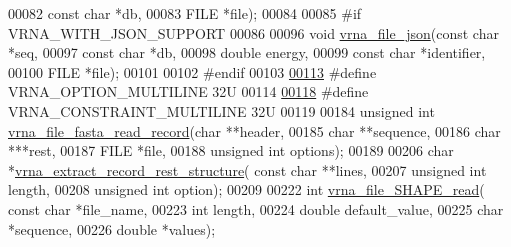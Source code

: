 \begin{DoxyCode}
00082                       \textcolor{keyword}{const} \textcolor{keywordtype}{char} *db,
00083                       FILE *file);
00084 
00085 \textcolor{preprocessor}{#if VRNA\_WITH\_JSON\_SUPPORT}
00086 
00096 \textcolor{keywordtype}{void} \hyperlink{group__file__utils_ga31f4a6c2ea1495a6e4f9eb45a9f6193d}{vrna\_file\_json}(\textcolor{keyword}{const} \textcolor{keywordtype}{char} *seq,
00097                     \textcolor{keyword}{const} \textcolor{keywordtype}{char} *db,
00098                     \textcolor{keywordtype}{double} energy,
00099                     \textcolor{keyword}{const} \textcolor{keywordtype}{char} *identifier,
00100                     FILE *file);
00101 
00102 \textcolor{preprocessor}{#endif}
00103 
\hyperlink{group__file__utils_gabec89c09874528c6cb73140a4c3d86d7}{00113} \textcolor{preprocessor}{#define VRNA\_OPTION\_MULTILINE             32U}
00114 
\hyperlink{group__file__utils_ga7d725ef525b29891abef3f1ed42599a4}{00118} \textcolor{preprocessor}{#define VRNA\_CONSTRAINT\_MULTILINE         32U}
00119 
00184 \textcolor{keywordtype}{unsigned} \textcolor{keywordtype}{int} \hyperlink{group__file__utils_ga8cfb7e271efc9e1f34640acb85475639}{vrna\_file\_fasta\_read\_record}(\textcolor{keywordtype}{char} **header,
00185                                     \textcolor{keywordtype}{char} **sequence,
00186                                     \textcolor{keywordtype}{char}  ***rest,
00187                                     FILE *file,
00188                                     \textcolor{keywordtype}{unsigned} \textcolor{keywordtype}{int} options);
00189 
00206 \textcolor{keywordtype}{char} *\hyperlink{group__file__utils_gad37cbb63a05eed63ba25c91628409be0}{vrna\_extract\_record\_rest\_structure}( \textcolor{keyword}{const} \textcolor{keywordtype}{char} **lines,
00207                                           \textcolor{keywordtype}{unsigned} \textcolor{keywordtype}{int} length,
00208                                           \textcolor{keywordtype}{unsigned} \textcolor{keywordtype}{int} option);
00209 
00222 \textcolor{keywordtype}{int} \hyperlink{group__file__utils_ga646ebf45450a69a7f2533f9ecd283a32}{vrna\_file\_SHAPE\_read}( \textcolor{keyword}{const} \textcolor{keywordtype}{char} *file\_name,
00223                           \textcolor{keywordtype}{int} length,
00224                           \textcolor{keywordtype}{double} default\_value,
00225                           \textcolor{keywordtype}{char} *sequence,
00226                           \textcolor{keywordtype}{double} *values);

\end{DoxyCode}
